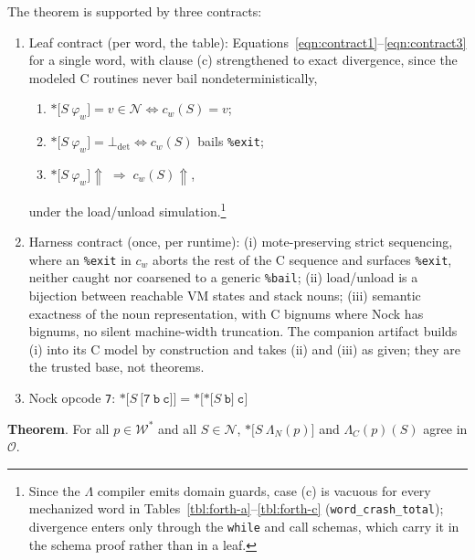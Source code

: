 \documentclass[twoside]{article}
\begin{document}
\noindent
The theorem is supported by three contracts:
\begin{enumerate}
  \item  Leaf contract (per word, the table): Equations~\ref{eqn:contract1}--\ref{eqn:contract3} for a single word, with clause (c) strengthened to exact divergence, since the modeled C routines never bail nondeterministically,
  \begin{enumerate}
    \item  $\texttt{*[}S\ \varphi_w\texttt{]} = v \in \mathcal{N} \iff c_w(S) = v$;
    \item  $\texttt{*[}S\ \varphi_w\texttt{]} = \bot_\text{det} \iff c_w(S)$ bails
    \lstinline[style=inlinecode]{%exit};
    \item  $\texttt{*[}S\ \varphi_w\texttt{]} \Uparrow\; \Longrightarrow\; c_w(S)
    \Uparrow$,
  \end{enumerate}
  \noindent under the load/unload simulation.\footnote{Since the $\Lambda$ compiler emits domain guards, case (c) is vacuous for every mechanized word in Tables~\ref{tbl:forth-a}--\ref{tbl:forth-c} (\texttt{word\_crash\_total}); divergence enters only through the \texttt{while} and call schemas, which carry it in the schema proof rather than in a leaf.}
  \item  Harness contract (once, per runtime): (i) mote-preserving strict sequencing, where an \lstinline[style=inlinecode]{%exit} in $c_w$ aborts the rest of the C sequence and surfaces \lstinline[style=inlinecode]{%exit}, neither caught nor coarsened to a generic \lstinline[style=inlinecode]{%bail}; (ii) load/unload is a bijection between reachable VM states and stack nouns; (iii) semantic exactness of the noun representation, with C bignums where Nock has bignums, no silent machine-width truncation.  The companion artifact builds (i) into its C model by construction and takes (ii) and (iii) as given; they are the trusted base, not theorems.
  \item  Nock opcode \lstinline[style=inlinecode]{7}: $\texttt{*[}S\ \texttt{[7}\ \texttt{b}\ \texttt{c}\texttt{]]} = \texttt{*[*[}S\ \texttt{b}\texttt{]}\ \texttt{c}\texttt{]}$
\end{enumerate}

\textbf{Theorem}.  For all $p \in \mathcal{W}^*$ and all $S \in \mathcal{N}$, $\texttt{*[}S\ \Lambda_N(p)\texttt{]}$ and $\Lambda_C(p)(S)$ agree in $\mathcal{O}$.
\end{document}
